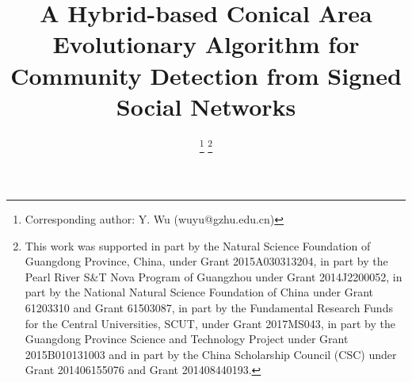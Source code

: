 \documentclass[10pt, journal]{IEEEtran}
\begin{document}
\title{A Hybrid-based Conical Area Evolutionary Algorithm for Community Detection from Signed Social Networks}


\author{



\thanks{Corresponding author: Y. Wu (wuyu@gzhu.edu.cn)}
\thanks{
			This work was supported in part by the Natural Science Foundation of Guangdong Province, China, under Grant 2015A030313204,
			in part by the Pearl River S\&T Nova Program of Guangzhou under Grant 2014J2200052,
			in part by the National Natural Science Foundation of China under Grant 61203310 and Grant 61503087,
			in part by the Fundamental Research Funds for the Central Universities, SCUT, under Grant 2017MS043,
            in part by the Guangdong Province Science and Technology Project under Grant 2015B010131003 and
            in part by the China Scholarship Council (CSC) under Grant 201406155076 and Grant 201408440193.}

}


%
\end{document}
